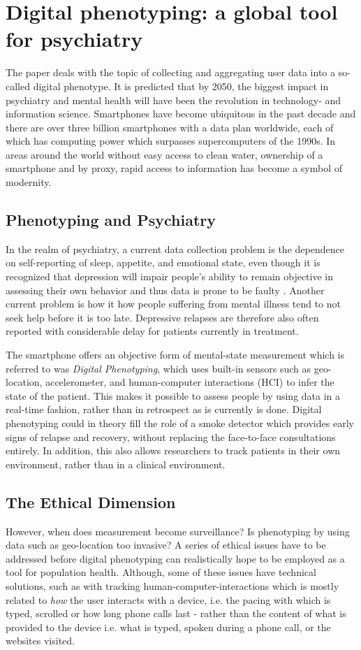 \section{Digital phenotyping: a global tool for psychiatry}
The paper \cite{digital_phenotyping} deals with the topic of collecting and aggregating user data into a so-called digital phenotype. It is predicted that by 2050, the biggest impact in psychiatry and mental health will have been the revolution in technology- and information science. Smartphones have become ubiquitous in the past decade and there are over three billion smartphones with a data plan worldwide, each of which has computing power which surpasses supercomputers of the 1990s. In areas around the world without easy access to clean water, ownership of a smartphone and by proxy, rapid access to information has become a symbol of modernity. 

\subsection{Phenotyping and Psychiatry}
In the realm of psychiatry, a current data collection problem is the dependence on self-reporting of sleep, appetite, and emotional state, even though it is recognized that depression will impair people's ability to remain objective in assessing their own behavior and thus data is prone to be faulty \cite{digital_phenotyping}. Another current problem is how it how people suffering from mental illness tend to not seek help before it is too late. Depressive relapses are therefore also often reported with considerable delay for patients currently in treatment. 

The smartphone offers an objective form of mental-state measurement which is referred to was \textit{Digital Phenotyping}, which uses built-in sensors such as geo-location, accelerometer, and human-computer interactions (HCI) to infer the state of the patient. This makes it possible to assess people by using data in a real-time fashion, rather than in retrospect as is currently is done. Digital phenotyping could in theory fill the role of a smoke detector which provides early signs of relapse and recovery, without replacing the face-to-face consultations entirely. In addition, this also allows researchers to track patients in their own environment, rather than in a clinical environment.

\subsection{The Ethical Dimension}
However, when does measurement become surveillance? Is phenotyping by using data such as geo-location too invasive? A series of ethical issues have to be addressed before digital phenotyping can realistically hope to be employed as a tool for population health. Although, some of these issues have technical solutions, such as with tracking human-computer-interactions which is mostly related to \textit{how} the user interacts with a device, i.e. the pacing with which is typed, scrolled or how long phone calls last - rather than the content of what is provided to the device i.e. what is typed, spoken during a phone call, or the websites visited. 
